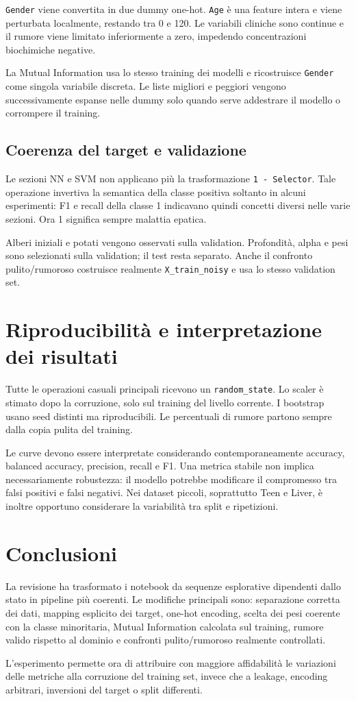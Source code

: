 \documentclass[11pt,a4paper]{article}
\begin{document}
\texttt{Gender} viene convertita in due dummy one-hot. \texttt{Age} è una feature intera e viene perturbata localmente, restando tra 0 e 120. Le variabili cliniche sono continue e il rumore viene limitato inferiormente a zero, impedendo concentrazioni biochimiche negative.

La Mutual Information usa lo stesso training dei modelli e ricostruisce \texttt{Gender} come singola variabile discreta. Le liste migliori e peggiori vengono successivamente espanse nelle dummy solo quando serve addestrare il modello o corrompere il training.

\subsection{Coerenza del target e validazione}

Le sezioni NN e SVM non applicano più la trasformazione \texttt{1 - Selector}. Tale operazione invertiva la semantica della classe positiva soltanto in alcuni esperimenti: F1 e recall della classe 1 indicavano quindi concetti diversi nelle varie sezioni. Ora 1 significa sempre malattia epatica.

Alberi iniziali e potati vengono osservati sulla validation. Profondità, alpha e pesi sono selezionati sulla validation; il test resta separato. Anche il confronto pulito/rumoroso costruisce realmente \texttt{X\_train\_noisy} e usa lo stesso validation set.

\section{Riproducibilità e interpretazione dei risultati}

Tutte le operazioni casuali principali ricevono un \texttt{random\_state}. Lo scaler è stimato dopo la corruzione, solo sul training del livello corrente. I bootstrap usano seed distinti ma riproducibili. Le percentuali di rumore partono sempre dalla copia pulita del training.

Le curve devono essere interpretate considerando contemporaneamente accuracy, balanced accuracy, precision, recall e F1. Una metrica stabile non implica necessariamente robustezza: il modello potrebbe modificare il compromesso tra falsi positivi e falsi negativi. Nei dataset piccoli, soprattutto Teen e Liver, è inoltre opportuno considerare la variabilità tra split e ripetizioni.

\section{Conclusioni}

La revisione ha trasformato i notebook da sequenze esplorative dipendenti dallo stato in pipeline più coerenti. Le modifiche principali sono: separazione corretta dei dati, mapping esplicito dei target, one-hot encoding, scelta dei pesi coerente con la classe minoritaria, Mutual Information calcolata sul training, rumore valido rispetto al dominio e confronti pulito/rumoroso realmente controllati.

L'esperimento permette ora di attribuire con maggiore affidabilità le variazioni delle metriche alla corruzione del training set, invece che a leakage, encoding arbitrari, inversioni del target o split differenti.
\end{document}
